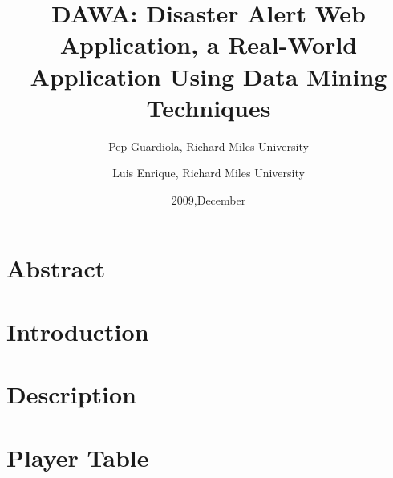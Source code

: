 \documentclass[12pt]{article}
\title{DAWA: Disaster Alert Web Application, a Real-World Application Using Data Mining
Techniques }
\date{2009,December}
\author{Pep Guardiola, Richard Miles University 
\and 
Luis Enrique, Richard Miles University }
\begin{document}
\maketitle  %

\newpage    %


\tableofcontents

\listoffigures

\listoftables

\newpage

\section*{Abstract}


\section{Introduction}


\section{Description}


\section{Player Table}






\end{document}
